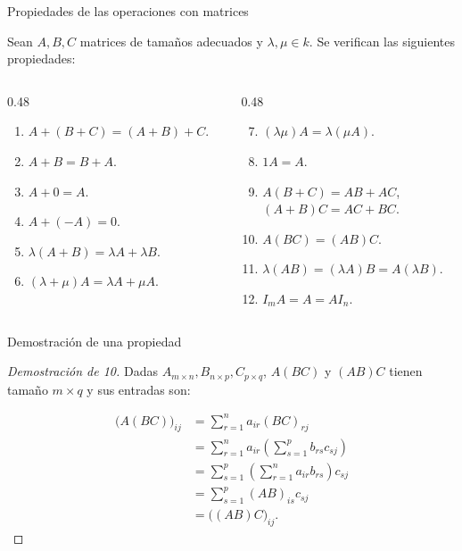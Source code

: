 \begin{frame}{Propiedades de las operaciones con matrices}

\begin{proposition}
Sean \(A,B,C\) matrices de tamaños adecuados y \(\lambda,\mu\in k\). Se verifican las siguientes propiedades:

\medskip

\begin{columns}[T]
\begin{column}{0.48\textwidth}
\begin{enumerate}
    \item \(A+(B+C)=(A+B)+C\).
    \item \(A+B=B+A\).
    \item \(A+0=A\).
    \item \(A+(-A)=0\).
    \item \(\lambda(A+B)=\lambda A+\lambda B\).
    \item \((\lambda+\mu)A=\lambda A+\mu A\).
\end{enumerate}
\end{column}

\begin{column}{0.48\textwidth}
\begin{enumerate}
    \setcounter{enumi}{6}
    \item \((\lambda\mu)A=\lambda(\mu A)\).
    \item \(1A=A\).
    \item \(A(B+C)=AB+AC\),\\
          \((A+B)C=AC+BC\).
    \item \(A(BC)=(AB)C\).
	 \item \(\lambda(AB)=(\lambda A)B=A(\lambda B)\).
    \item \(I_mA=A=AI_n\).
\end{enumerate}
\end{column}
\end{columns}
\end{proposition}

\end{frame}

\begin{frame}{Demostración de una propiedad}

\begin{proof}[Demostración de 10]
Dadas \(A_{m\times n},B_{n\times p},C_{p\times q}\), $A(BC)$ y $(AB)C$ tienen tamaño $m\times q$ y sus entradas son:

\vspace{-10pt}

\begin{align*}
\bigl(A(BC)\bigr)_{ij}
 &=\sum_{r=1}^{n}a_{ir}(BC)_{rj}\\
 &=\sum_{r=1}^{n}a_{ir}
   \left(\sum_{s=1}^{p}b_{rs}c_{sj}\right)\\
 &=\sum_{s=1}^{p}
   \left(\sum_{r=1}^{n}a_{ir}b_{rs}\right)c_{sj}\\
 &=\sum_{s=1}^{p}(AB)_{is}c_{sj}\\
 &=\bigl((AB)C\bigr)_{ij}.
\end{align*}

\end{proof}

\end{frame}

